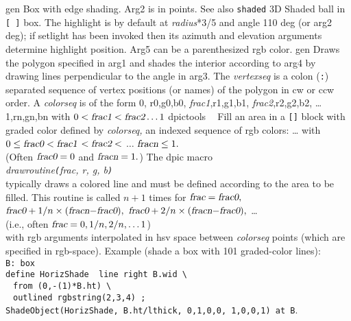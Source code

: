 %
  {gen}%
  {Box with edge shading.  Arg2 is in points. See also {\tt shaded} }%
%
  {3D}%
  { Shaded ball in {\tt [ ]} box.
    The highlight is by default at {\sl radius}*3/5 and angle 110 deg
    (or arg2 deg); if setlight has been invoked then its azimuth and
    elevation arguments determine highlight position.  Arg5 can be a
    parenthesized rgb color.}
 {gen}%
  {Draws the polygon specified in arg1 and
  shades the interior according
   to arg4 by drawing lines perpendicular to the angle in arg3.  The {\sl
   vertexseq} is a colon ({\tt:}) separated sequence of vertex positions
   (or names) of the polygon in cw or ccw order. A {\sl colorseq} is of
   the form 0, r0,g0,b0, {\sl frac1},r1,g1,b1, {\sl frac2},r2,g2,b2,
   \ldots 1,rn,gn,bn with $0 < \hbox{\sl frac1} < \hbox{\sl frac2} \ldots 1$ }%
%
  {dpictools}%
  {$\;\;$
  Fill an area in a {\tt []} block with graded color
  defined by {\sl colorseq,} an indexed sequence of rgb colors:
    \ldots
     with\\
  $0 \leq \hbox{\sl frac0} < \hbox{\sl frac1}$
   $< \hbox{\sl frac2} <$
   $\ldots$ 
   $\hbox{\sl fracn} \leq 1.$\\  
  (Often $\hbox{\sl frac0} = 0$ and $\hbox{\sl fracn} = 1.$)
  The dpic macro\\
  {\sl drawroutine{\tt(}frac, r, g, b{\tt)}}\\
  typically draws a colored line
  and must be defined according to the area to be filled.
  This routine is called $n{+}1$ times for
  $\hbox{\sl frac}= \hbox{\sl frac0},\;$
   $\hbox{\sl frac0} + 1/n\times(\hbox{\sl fracn}{-}\hbox{\sl frac0}),$
   $\hbox{\sl frac0} + 2/n\times(\hbox{\sl fracn}{-}\hbox{\sl frac0}),$
   \ldots
   \\
  (i.e., often
  $\hbox{\sl frac} = 0, 1/n, 2/n, \ldots 1$)\\
  with rgb
  arguments interpolated in hsv space between {\sl colorseq} points
  (which are specified in rgb-space).
  Example (shade a box with 101 graded-color lines):\\ 
  {\tt B: box\\
   define HorizShade \lbr\ line right B.wid \textbackslash\\
   $\;$ from (0,-(1)*B.ht) \textbackslash\\
   $\;$ outlined rgbstring(2,3,4) \rbr;}\\
  {\tt ShadeObject(HorizShade, B.ht/lthick, 0,1,0,0, 1,0,0,1) at B}.
  }%
